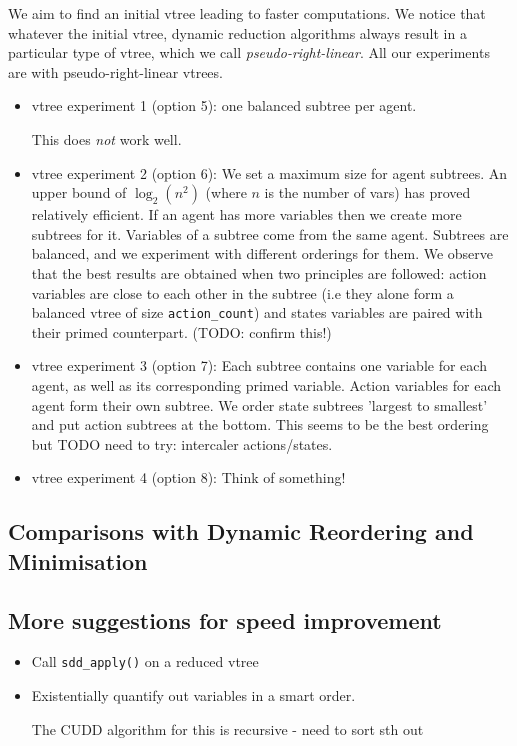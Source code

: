 \documentclass[12]{article}
\begin{document}
We aim to find an initial vtree leading to faster computations. We notice that whatever the initial vtree, dynamic reduction algorithms always result in a particular type of vtree, which we call \textit{pseudo-right-linear}. 
All our experiments are with pseudo-right-linear vtrees.
\begin{itemize}
\item vtree experiment 1 (option 5): one balanced subtree per agent. 

This does \textit{not} work well.
\item vtree experiment 2 (option 6): We set a maximum size for agent subtrees. An upper bound of $\log_2(n^2)$ (where $n$ is the number of vars) has proved relatively efficient. If an agent has more variables then we create more subtrees for it. Variables of a subtree come from the same agent. Subtrees are balanced, and we experiment with different orderings for them. We observe that the best results are obtained when two principles are followed: action variables are close to each other in the subtree (i.e they alone form a balanced vtree of size \texttt{action\_count}) and states variables are 
paired with their primed counterpart. (TODO: confirm this!)

\item vtree experiment 3 (option 7): Each subtree contains one variable for each agent, as well as its corresponding primed variable. Action variables for each agent form their own subtree. We order state subtrees 'largest to smallest' and put action subtrees at the bottom. This seems to be the best ordering but TODO need to try: intercaler actions/states.

\item vtree experiment 4 (option 8): Think of something! 

\end{itemize}

\subsection{Comparisons with Dynamic Reordering and Minimisation}



\subsection{More suggestions for speed improvement} 
\begin{itemize}
\item Call \texttt{sdd\_apply()} on a reduced vtree
\item Existentially quantify out variables in a smart order.

The CUDD algorithm for this is recursive - need to sort sth out

\end{itemize}
\end{document}
